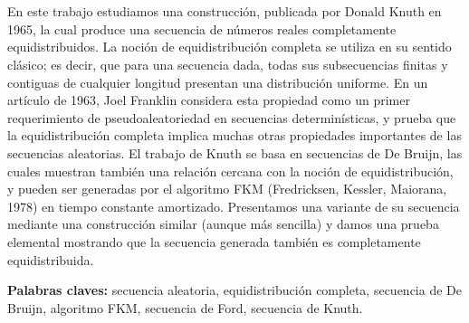 \chapter*{\runtitulo}

\noindent En este trabajo estudiamos una construcción, publicada por Donald Knuth en 1965, la cual produce una secuencia de números reales completamente equidistribuidos. La noción de equidistribución completa se utiliza en su sentido clásico; es decir, que para una secuencia dada, todas sus subsecuencias finitas y contiguas de cualquier longitud presentan una distribución uniforme. En un artículo de 1963, Joel Franklin considera esta propiedad como un primer requerimiento de pseudoaleatoriedad en secuencias determinísticas, y prueba que la equidistribución completa implica muchas otras propiedades importantes de las secuencias aleatorias. El trabajo de Knuth se basa en secuencias de De Bruijn, las cuales muestran también una relación cercana con la noción de equidistribución, y pueden ser generadas por el algoritmo FKM (Fredricksen, Kessler, Maiorana, 1978) en tiempo constante amortizado. Presentamos una variante de su secuencia mediante una construcción similar (aunque más sencilla) y damos una prueba elemental mostrando que la secuencia generada también es completamente equidistribuida.

\bigskip

\noindent\textbf{Palabras claves:} secuencia aleatoria, equidistribución completa, secuencia de De Bruijn, algoritmo FKM, secuencia de Ford, secuencia de Knuth.
